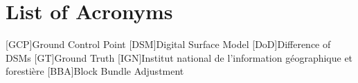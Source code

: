 
\chapter*{List of Acronyms}



\begin{acronym}
	[GCP]{Ground Control Point}
	[DSM]{Digital Surface Model}
	[DoD]{Difference of DSMs}
	[GT]{Ground Truth}
	[IGN]{Institut national de l'information géographique et forestière}
	[BBA]{Block Bundle Adjustment}
\end{acronym}

%
%


